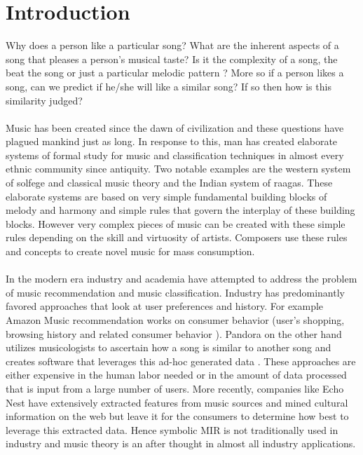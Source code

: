 \chapter{Introduction}
\label{sec:intro}

\noindent Why does a person like a particular song? What are the inherent aspects of a song that pleases a person's musical taste? Is it the complexity of a song, the beat the song or just a particular melodic pattern ? More so if a person likes a song, can we predict if he/she will like a similar song? If so then how is this similarity judged? \\\\
Music has been created since the dawn of civilization and these questions have plagued mankind just as long. In response to this, man has created elaborate systems of formal study for music and classification techniques in almost every ethnic community since antiquity. Two notable examples are the western system of solfege and classical music theory and the Indian system of raagas. These elaborate systems are based on very simple fundamental building blocks of melody and harmony and simple rules that govern the interplay of these building blocks. However very complex pieces of music can be created with these simple rules depending on the skill and virtuosity of artists. Composers use these rules and concepts to create novel music for mass consumption. \\\\
In the modern era industry and academia have attempted to address the problem of music recommendation and music classification. Industry has predominantly favored approaches that look at user preferences and history. For example Amazon Music recommendation works on consumer behavior (user's shopping, browsing history and related consumer behavior \cite{amazonreco}). Pandora on the other hand utilizes musicologists to ascertain how a song is similar to another song and creates software that leverages this ad-hoc generated data \cite{musicgenomepandora}. These approaches are either expensive in the human labor needed or in the amount of data processed that is input from a large number of users. More recently, companies like Echo Nest have extensively extracted features from music sources \cite{echonestfingerprint} and mined cultural information on the web but leave it for the consumers to determine how best to leverage this extracted data. Hence symbolic MIR is not traditionally used in industry and music theory is an after thought in almost all industry applications. \\\\
